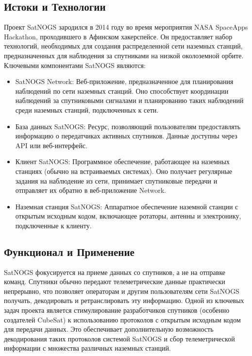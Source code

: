 \documentclass[12pt, a4paper]{extreport}
\begin{document}
\subsection{Истоки и Технологии}

Проект SatNOGS зародился в 2014 году во время мероприятия NASA SpaceApps Hackathon, проходившего в Афинском хакерспейсе. Он предоставляет набор технологий, необходимых для создания распределенной сети наземных станций, предназначенных для наблюдения за спутниками на низкой околоземной орбите.
Ключевыми компонентами SatNOGS являются:

\begin{itemize}[label=\textbullet]
    \item	SatNOGS Network: Веб-приложение, предназначенное для планирования наблюдений по сети наземных станций. Оно способствует координации наблюдений за спутниковыми сигналами и планированию таких наблюдений среди наземных станций, подключенных к сети.
    \item	База данных SatNOGS: Ресурс, позволяющий пользователям предоставлять информацию о передатчиках активных спутников. Данные доступны через API или веб-интерфейс.
    \item	Клиент SatNOGS: Программное обеспечение, работающее на наземных станциях (обычно на встраиваемых системах). Оно получает регулярные задания на наблюдение из сети, принимает спутниковые передачи и отправляет их обратно в веб-приложение Network.
    \item	Наземная станция SatNOGS: Аппаратное обеспечение наземной станции с открытым исходным кодом, включающее ротаторы, антенны и электронику, подключенные к клиенту.
\end{itemize}

\subsection{Функционал и Применение}

SatNOGS фокусируется на приеме данных со спутников, а не на отправке команд. Спутники обычно передают телеметрические данные практически непрерывно, что позволяет операторам и другим пользователям сети SatNOGS получать, декодировать и ретранслировать эту информацию.
Одной из ключевых задач проекта является стимулирование разработчиков спутников (особенно создателей CubeSat) к использованию протоколов с открытым исходным кодом для передачи данных. Это обеспечивает дополнительную возможность декодирования таких протоколов системой SatNOGS и сбор телеметрической информации с множества различных наземных станций.
\end{document}

